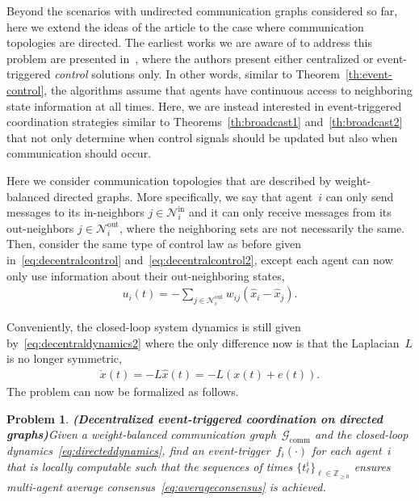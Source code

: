 \documentclass{autart}
\newtheorem{problem}[theorem]{Problem}
\newcommand{\integernonnegative}{\mathbb{Z}_{\ge 0}}
\newcommand{\GG}{{\mathcal{G}}}
\newcommand{\NN}{{\mathcal{N}}}
\newcommand{\commgraph}{\GG_\text{comm}}
\renewcommand{\hat}{\widehat}
\newcommand{\longthmtitle}[1]{\mbox{}\textup{\textbf{(#1)}}}
\begin{document}
Beyond the scenarios with undirected communication graphs considered
so far, here we extend the ideas of the article to the case where
communication topologies are directed.  The earliest works we are
aware of to address this problem are presented
in~\citep{ZL-ZC:11,ZL-ZC-ZY:12,XC-FH-AR:14,DX-JX:14}, where the
authors present either centralized or event-triggered \emph{control}
solutions only. In other words, similar to
Theorem~\ref{th:event-control}, the algorithms assume that agents have
continuous access to neighboring state information at all times. %
Here, we are instead interested in event-triggered coordination
strategies similar to Theorems~\ref{th:broadcast1}
and~\ref{th:broadcast2} that not only determine when control signals
should be updated but also when communication should occur.

Here we consider communication topologies that are described by
weight-balanced directed graphs. More specifically, we say that
agent~$i$ can only send messages to its in-neighbors
$j \in \NN_i^\text{in}$ and it can only receive messages from its
out-neighbors $j \in \NN_i^\text{out}$, where the neighboring sets are
not necessarily the same. Then, consider the same type of control law
as before given in~\eqref{eq:decentralcontrol}
and~\eqref{eq:decentralcontrol2}, except each agent can now only use
information about their out-neighboring states,
\begin{align}\label{eq:directedcontrol}
  u_i(t) = - \sum_{j \in \NN_i^\text{out}} w_{ij} (\hat{x}_i - \hat{x}_j).
\end{align}

Conveniently, the closed-loop system dynamics is still given
by~\eqref{eq:decentraldynamics2} where the only difference now is that
the Laplacian~$L$ is no longer symmetric,
\begin{align}\label{eq:directeddynamics}
  \dot{x}(t) = -L \hat{x}(t) = -L(x(t) + e(t)) . 
\end{align}
The problem can now be formalized as follows.

\begin{problem}\longthmtitle{Decentralized event-triggered
    coordination on directed graphs}\label{pr:directed}
  Given a weight-balanced communication graph~$\commgraph$ and the
  closed-loop dynamics~\eqref{eq:directeddynamics}, find an
  event-trigger~$f_i(\cdot)$ for each agent~$i$ that is locally
  computable such that the sequences of times $\{ t_\ell^i \}_{\ell
    \in \integernonnegative}$ ensures multi-agent average
  consensus~\eqref{eq:averageconsensus} is achieved.
\end{problem}
\end{document}
